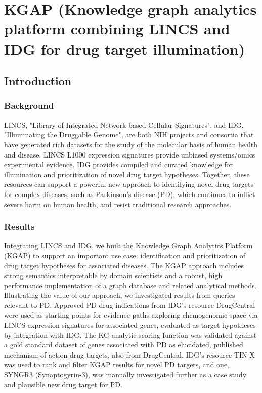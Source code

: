 \chapter{KGAP (Knowledge graph analytics platform combining LINCS and IDG for drug target illumination)}

\section{Introduction}

\subsection{Background}

LINCS, "Library of Integrated Network-based Cellular Signatures", and IDG, "Illuminating the Druggable Genome", are both NIH projects and consortia that have generated rich datasets for the study of the molecular basis of human health and disease.  LINCS L1000 expression signatures provide unbiased systems/omics experimental evidence. IDG provides compiled and curated knowledge for illumination and prioritization of novel drug target hypotheses. Together, these resources can support a powerful new approach to identifying novel drug targets for complex diseases, such as Parkinson's disease (PD), which continues to inflict severe harm on human health, and resist traditional research approaches.

\subsection{Results}

Integrating LINCS and IDG, we built the Knowledge Graph Analytics Platform (KGAP) to support an important use case: identification and prioritization of drug target hypotheses for associated diseases. The KGAP approach includes strong semantics interpretable by domain scientists and a robust, high performance implementation of a graph database and related analytical methods. Illustrating the value of our approach, we investigated results from queries relevant to PD. Approved PD drug indications from IDG’s resource DrugCentral were used as starting points for evidence paths exploring chemogenomic space via LINCS expression signatures for associated genes, evaluated as target hypotheses by integration with IDG. The KG-analytic scoring function was validated against a gold standard dataset of genes associated with PD as elucidated, published mechanism-of-action drug targets, also from DrugCentral. IDG's resource TIN-X was used to rank and filter KGAP results for novel PD targets, and one, SYNGR3 (Synaptogyrin-3), was manually investigated further as a case study and plausible new drug target for PD.

